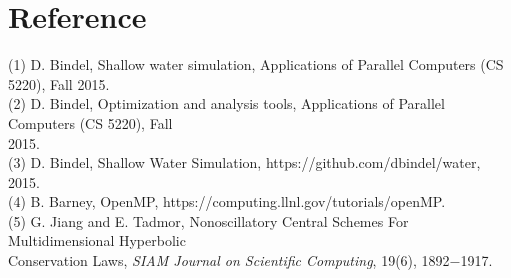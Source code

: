 \documentclass[12pt]{article}
\numberwithin{equation}{section}
\begin{document}
\section*{Reference}

(1) D. Bindel, Shallow water simulation, Applications of Parallel Computers (CS 5220), Fall 2015.
\\
(2) D. Bindel, Optimization and analysis tools, Applications of Parallel Computers (CS 5220), Fall\\ 2015.
\\
(3) D. Bindel, Shallow Water Simulation, https://github.com/dbindel/water, 2015.
\\
(4) B. Barney, OpenMP, https://computing.llnl.gov/tutorials/openMP.
\\
(5) G. Jiang and E. Tadmor, Nonoscillatory Central Schemes For Multidimensional Hyperbolic\\ Conservation Laws, {\em SIAM Journal on Scientific Computing}, 19(6), 1892$-$1917.
\end{document}
